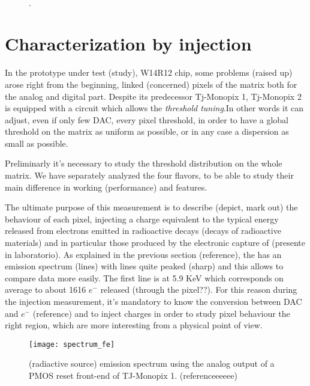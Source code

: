 \begin{figure}[h!]
\centering
{}\quad
{}\\
\caption{.}
\label{fig:tot_vs_icasn}
\end{figure}

\section{Characterization by injection}

In the prototype under test (study), W14R12 chip, some problems (raised up) arose right from the beginning, linked (concerned) pixels of the matrix both for the analog and digital part.
Despite its predecessor Tj-Monopix 1, Tj-Monopix 2 is equipped with a circuit which allows the \textit{threshold tuning}.In other words it can adjust, even if only few DAC, every pixel threshold, in order to have a global threshold on the matrix as uniform as possible, or in any case a dispersion as small as possible.

Preliminarly it's necessary to study the threshold distribution on the whole matrix. We have separately analyzed the four flavors, to be able to study their main difference in working (performance) and features.

The ultimate purpose of this measurement is to describe (depict, mark out) the behaviour of each pixel, injecting a charge equivalent to the typical energy released from electrons emitted in radioactive decays (decays of radioactive materials) and in particular those produced by the electronic capture of  (presente in laboratorio). As explained in the previous section (reference), the  has an emission spectrum (lines) with lines quite peaked (sharp) and this allows to compare data more easily. The first line is at 5.9 KeV which corresponds on average to about 1616 $e^{-}$ released (through the pixel??).
For this reason during the injection measurement, it's mandatory to know the conversion between DAC and $e^{-}$ (reference) and to inject charges in order to study pixel behaviour  the right region, which are more interesting from a physical point of view.

\begin{figure}[h!]
\centering
\texttt{[image: spectrum\_fe]}
\caption{ (radiactive source) emission spectrum using the analog output of a PMOS reset front-end of TJ-Monopix 1. (referenceeeeee)}
\label{fig:fespectrum}
\end{figure}

